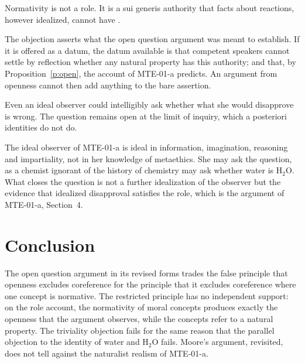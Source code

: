 \documentclass{situationist-preprint}
\begin{document}
\begin{objection}
Normativity is not a role. It is a sui generis authority that facts about reactions, however idealized, cannot have \citep{Enoch2011}.
\end{objection}

\begin{reply}
The objection asserts what the open question argument was meant to establish. If it is offered as a datum, the datum available is that competent speakers cannot settle by reflection whether any natural property has this authority; and that, by Proposition~\ref{p:open}, the account of MTE-01-a predicts. An argument from openness cannot then add anything to the bare assertion.
\end{reply}

\begin{objection}
Even an ideal observer could intelligibly ask whether what she would disapprove is wrong. The question remains open at the limit of inquiry, which a posteriori identities do not do.
\end{objection}

\begin{reply}
The ideal observer of MTE-01-a is ideal in information, imagination, reasoning and impartiality, not in her knowledge of metaethics. She may ask the question, as a chemist ignorant of the history of chemistry may ask whether water is H$_2$O. What closes the question is not a further idealization of the observer but the evidence that idealized disapproval satisfies the role, which is the argument of MTE-01-a, Section~4.
\end{reply}

\section{Conclusion}

The open question argument in its revised forms trades the false principle that openness excludes coreference for the principle that it excludes coreference where one concept is normative. The restricted principle has no independent support: on the role account, the normativity of moral concepts produces exactly the openness that the argument observes, while the concepts refer to a natural property. The triviality objection fails for the same reason that the parallel objection to the identity of water and H$_2$O fails. Moore's argument, revisited, does not tell against the naturalist realism of MTE-01-a.
\end{document}
